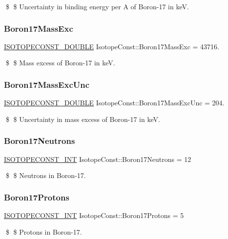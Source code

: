 \$ \$ Uncertainty in binding energy per A of Boron-\/17 in keV. \mbox{\label{group___isotope_const-_boron-_b17_ga50650df0316a8ce12b96c4200e2258fc}} 
\subsubsection{\texorpdfstring{Boron17\+Mass\+Exc}{Boron17MassExc}}
{\footnotesize\ttfamily \mbox{\hyperlink{group___isotope_const-_macros_ga8f45a7272ce02c0b4c65c44636ed719a}{I\+S\+O\+T\+O\+P\+E\+C\+O\+N\+S\+T\+\_\+\+D\+O\+U\+B\+LE}} Isotope\+Const\+::\+Boron17\+Mass\+Exc = 43716.}

\$ \$ Mass excess of Boron-\/17 in keV. \mbox{\label{group___isotope_const-_boron-_b17_ga2cb0c254fad8f0e6fba6b730658f241d}} 
\subsubsection{\texorpdfstring{Boron17\+Mass\+Exc\+Unc}{Boron17MassExcUnc}}
{\footnotesize\ttfamily \mbox{\hyperlink{group___isotope_const-_macros_ga8f45a7272ce02c0b4c65c44636ed719a}{I\+S\+O\+T\+O\+P\+E\+C\+O\+N\+S\+T\+\_\+\+D\+O\+U\+B\+LE}} Isotope\+Const\+::\+Boron17\+Mass\+Exc\+Unc = 204.}

\$ \$ Uncertainty in mass excess of Boron-\/17 in keV. \mbox{\label{group___isotope_const-_boron-_b17_ga1aa5b0324097d4fd09c744ba4713c05b}} 
\subsubsection{\texorpdfstring{Boron17\+Neutrons}{Boron17Neutrons}}
{\footnotesize\ttfamily \mbox{\hyperlink{group___isotope_const-_macros_ga5f18360b3e99483a35c32d789e62621c}{I\+S\+O\+T\+O\+P\+E\+C\+O\+N\+S\+T\+\_\+\+I\+NT}} Isotope\+Const\+::\+Boron17\+Neutrons = 12}

\$ \$ Neutrons in Boron-\/17. \mbox{\label{group___isotope_const-_boron-_b17_gae3325a4891f7b71f1ef44abe910281d8}} 
\subsubsection{\texorpdfstring{Boron17\+Protons}{Boron17Protons}}
{\footnotesize\ttfamily \mbox{\hyperlink{group___isotope_const-_macros_ga5f18360b3e99483a35c32d789e62621c}{I\+S\+O\+T\+O\+P\+E\+C\+O\+N\+S\+T\+\_\+\+I\+NT}} Isotope\+Const\+::\+Boron17\+Protons = 5}

\$ \$ Protons in Boron-\/17. 